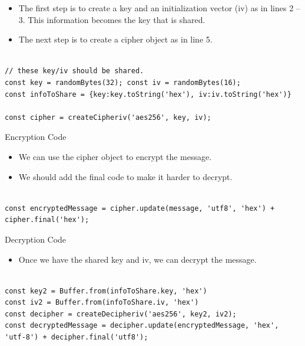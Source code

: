 \begin{frame}[fragile]{}

\begin{itemize}
	\item The first step is to create a key and an initialization vector (iv) as in lines 2 -- 3. This information becomes the key that is shared. 
	\item The next step is to create a cipher object as in line 5.
\end{itemize}

\begin{Code}{}%
\begin{lstlisting}[firstnumber=1, label=glabels, xleftmargin=0pt, basicstyle=\scriptsize]% 

// these key/iv should be shared. 
const key = randomBytes(32); const iv = randomBytes(16);
const infoToShare = {key:key.toString('hex'), iv:iv.toString('hex')}

const cipher = createCipheriv('aes256', key, iv);
\end{lstlisting}%
\end{Code}%

\end{frame}

\begin{frame}[fragile]{Encryption Code}

\begin{itemize}
	\item We can use the cipher object to encrypt the message. 
	\item We should add the final code to make it harder to decrypt. 
\end{itemize}

\begin{Code}{}%
\begin{lstlisting}[firstnumber=1, label=glabels, xleftmargin=0pt, basicstyle=\scriptsize]% 

const encryptedMessage = cipher.update(message, 'utf8', 'hex') + cipher.final('hex'); 
\end{lstlisting}%
\end{Code}%

\end{frame}

\begin{frame}[fragile]{Decryption Code}
\begin{itemize}
	\item Once we have the shared key and iv, we can decrypt the message. 
\end{itemize}

\begin{Code}{}%
\begin{lstlisting}[firstnumber=1, label=glabels, xleftmargin=0pt, basicstyle=\scriptsize]% 

const key2 = Buffer.from(infoToShare.key, 'hex')
const iv2 = Buffer.from(infoToShare.iv, 'hex')
const decipher = createDecipheriv('aes256', key2, iv2);
const decryptedMessage = decipher.update(encryptedMessage, 'hex', 'utf-8') + decipher.final('utf8');
\end{lstlisting}%
\end{Code}%
\end{frame}

